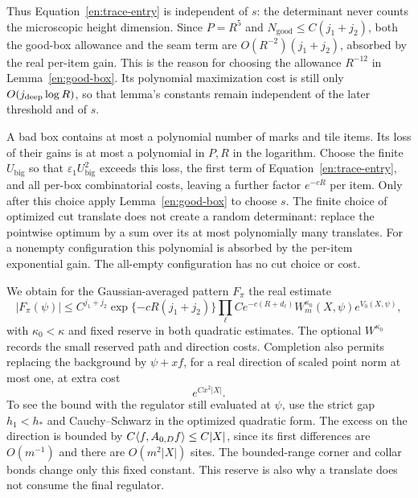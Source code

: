 Thus Equation~\eqref{en:trace-entry} is independent of $s$: the
determinant never counts the microscopic height dimension.  Since
$P=R^5$ and $N_{\mathrm{good}}\le C(j_1+j_2)$, both the good-box
allowance and the seam term are $O(R^{-2})(j_1+j_2)$, absorbed by
the real per-item gain.  This is the reason for choosing the allowance
$R^{-12}$ in Lemma~\ref{en:good-box}.  Its polynomial maximization
cost is still only $O(j_{\rm deep}\log R)$, so that lemma's constants
remain independent of the later threshold and of $s$.

A bad box contains at most a polynomial number of marks and tile
items.  Its loss of their gains is at most a polynomial in $P,R$
in the logarithm.  Choose the finite $U_{\mathrm{big}}$ so that
$\varepsilon_1U_{\mathrm{big}}^2$ exceeds this loss, the first term of
Equation~\eqref{en:trace-entry}, and all per-box combinatorial costs,
leaving a further factor $e^{-cR}$ per item.  Only after this choice
apply Lemma~\ref{en:good-box} to choose $s$.  The finite choice of
optimized cut translate does not create a random determinant: replace
the pointwise optimum by a sum over its at most polynomially many
translates.  For a nonempty configuration this polynomial is absorbed
by the per-item exponential gain.  The all-empty configuration has
no cut choice or cost.

We obtain for the Gaussian-averaged pattern $F_\pi$ the real estimate
\begin{equation}\label{en:averaged-pattern}
 |F_\pi(\psi)|\leq
 C^{j_1+j_2}\exp\{-cR(j_1+j_2)\}
 \prod_\ell Ce^{-c(R+d_\ell)}
 W_m^{\kappa_0}(X,\psi)e^{V_0(X,\psi)},
\end{equation}
with $\kappa_0<\kappa$ and fixed reserve in both quadratic estimates.
The optional $W^{\kappa_0}$ records the small reserved path and
direction costs.  Completion also permits replacing the background
by $\psi+xf$, for a real direction of scaled point norm at most one,
at extra cost
\begin{equation}\label{en:real-translate}
                              e^{C x^2|X|}.
\end{equation}
To see the bound with the regulator still evaluated at $\psi$, use
the strict gap $h_1<h_*$ and Cauchy--Schwarz in the optimized quadratic
form.  The excess on the direction is bounded by
$C\langle f,A_{0,D}f\rangle\leq C|X|$, since its first differences are
$O(m^{-1})$ and there are $O(m^2|X|)$ sites.  The bounded-range
corner and collar bonds change only this fixed constant.  This
reserve is also why a translate does not consume the final regulator.

